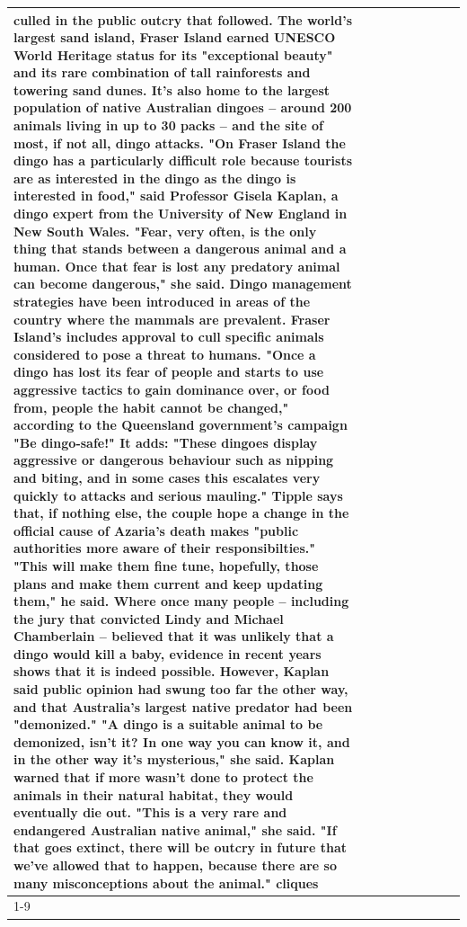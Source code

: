 \begin{table}[H]
\begin{tabular}{lllrlllll}
culled in the public outcry that followed. The world's largest sand island, Fraser Island earned UNESCO World Heritage status for its "exceptional beauty" and its rare combination of tall rainforests and towering sand dunes. It's also home to the largest population of native Australian dingoes -- around 200 animals living in up to 30 packs -- and the site of most, if not all, dingo attacks. "On Fraser Island the dingo has a particularly difficult role because tourists are as interested in the dingo as the dingo is interested in food," said Professor Gisela Kaplan, a dingo expert from the University of New England in New South Wales. "Fear, very often, is the only thing that stands between a dangerous animal and a human. Once that fear is lost any predatory animal can become dangerous," she said. Dingo management strategies have been introduced in areas of the country where the mammals are prevalent. Fraser Island's includes approval to cull specific animals considered to pose a threat to humans. "Once a dingo has lost its fear of people and starts to use aggressive tactics to gain dominance over, or food from, people the habit cannot be changed," according to the Queensland government's campaign "Be dingo-safe!" It adds: "These dingoes display aggressive or dangerous behaviour such as nipping and biting, and in some cases this escalates very quickly to attacks and serious mauling." Tipple says that, if nothing else, the couple hope a change in the official cause of Azaria's death makes "public authorities more aware of their responsibilties." "This will make them fine tune, hopefully, those plans and make them current and keep updating them," he said. Where once many people -- including the jury that convicted Lindy and Michael Chamberlain -- believed that it was unlikely that a dingo would kill a baby, evidence in recent years shows that it is indeed possible. However, Kaplan said public opinion had swung too far the other way, and that Australia's largest native predator had been "demonized." "A dingo is a suitable animal to be demonized, isn't it? In one way you can know it, and in the other way it's mysterious," she said. Kaplan warned that if more wasn't done to protect the animals in their natural habitat, they would eventually die out. "This is a very rare and endangered Australian native animal," she said. "If that goes extinct, there will be outcry in future that we've allowed that to happen, because there are so many misconceptions about the animal." cliques \\
\cline{1-9}

\end{tabular}
\end{table}
